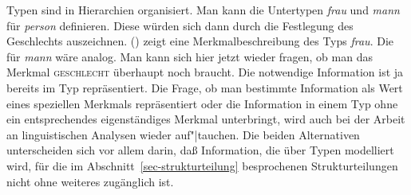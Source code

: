 Typen sind in Hierarchien organisiert.
Man kann \zb die Untertypen \textit{frau} und \textit{mann} für \textit{person}
definieren. Diese würden sich dann durch die Festlegung des Geschlechts auszeichnen.
() zeigt eine Merkmalbeschreibung des Typs \textit{frau}. Die für \textit{mann}
wäre analog.
\ea
{}
\z
Man kann sich hier jetzt wieder fragen, ob man das Merkmal \textsc{geschlecht} überhaupt
noch braucht. Die notwendige Information ist ja bereits im Typ  repräsentiert.
Die Frage, ob man bestimmte Information als Wert eines speziellen Merkmals repräsentiert oder die
Information in einem Typ ohne ein entsprechendes eigenständiges Merkmal unterbringt,  
wird auch bei der Arbeit an linguistischen Analysen wieder auf"|tauchen.
Die beiden Alternativen unterscheiden sich vor allem darin, daß Information, die
über Typen modelliert wird, für die im Abschnitt~\ref{sec-strukturteilung} besprochenen Strukturteilungen
nicht ohne weiteres %
zugänglich ist.


